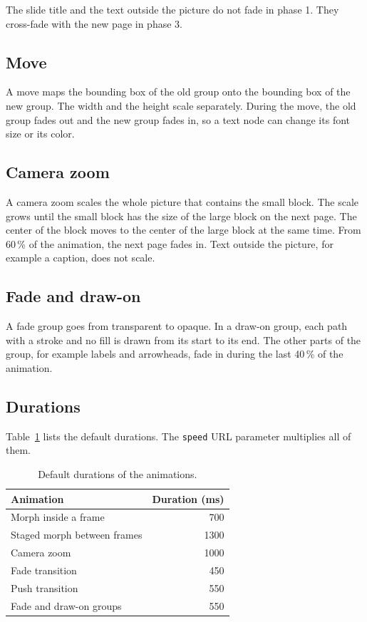\documentclass[11pt]{article}
\newcommand{\cmd}[1]{\texttt{#1}}
\begin{document}
The slide title and the text outside the picture do not fade in phase 1. They
cross-fade with the new page in phase 3.

\subsection{Move}

A move maps the bounding box of the old group onto the bounding box of the new
group. The width and the height scale separately. During the move, the old group
fades out and the new group fades in, so a text node can change its font size or
its color.

\subsection{Camera zoom}

A camera zoom scales the whole picture that contains the small block. The scale
grows until the small block has the size of the large block on the next page.
The center of the block moves to the center of the large block at the same time.
From 60\,\% of the animation, the next page fades in. Text outside the picture,
for example a caption, does not scale.

\subsection{Fade and draw-on}

A fade group goes from transparent to opaque. In a draw-on group, each path with
a stroke and no fill is drawn from its start to its end. The other parts of the
group, for example labels and arrowheads, fade in during the last 40\,\% of the
animation.

\subsection{Durations}

Table~\ref{tab:durations} lists the default durations. The \cmd{speed} URL
parameter multiplies all of them.

\begin{table}[ht]
	\centering
	\begin{tabular}{lr}
		\toprule
		Animation                   & Duration (ms) \\
		\midrule
		Morph inside a frame        & 700           \\
		Staged morph between frames & 1300          \\
		Camera zoom                 & 1000          \\
		Fade transition             & 450           \\
		Push transition             & 550           \\
		Fade and draw-on groups     & 550           \\
		\bottomrule
	\end{tabular}
	\caption{Default durations of the animations.}
	\label{tab:durations}
\end{table}
\end{document}
